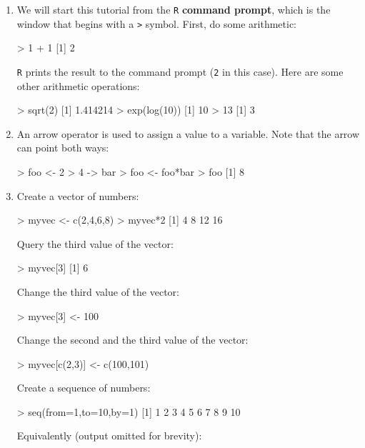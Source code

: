 \begin{enumerate}
\item We will start this tutorial from the \texttt{R} \textbf{command
  prompt}, which is the window that begins with a \verb|>|
  symbol. First, do some arithmetic:

\begin{console}
> 1 + 1
[1] 2
\end{console}

\texttt{R} prints the result to the command prompt (\verb|2| in this
case). Here are some other arithmetic operations:

\begin{console}
> sqrt(2)
[1] 1.414214
> exp(log(10))
[1] 10
> 13%
[1] 3
\end{console}

\item An arrow operator is used to assign a value to a variable. Note
  that the arrow can point both ways:

\begin{console}
> foo <- 2
> 4 -> bar
> foo <- foo*bar
> foo
[1] 8
\end{console}

\item Create a vector of numbers:

\begin{console}
> myvec <- c(2,4,6,8)
> myvec*2
[1]  4  8 12 16
\end{console}

Query the third value of the vector:

\begin{console}
> myvec[3]
[1] 6
\end{console}

Change the third value of the vector:

\begin{console}
> myvec[3] <- 100
\end{console}

Change the second and the third value of the vector:

\begin{console}
> myvec[c(2,3)] <- c(100,101)
\end{console}

Create a sequence of numbers:

\begin{console}
> seq(from=1,to=10,by=1)
 [1]  1  2  3  4  5  6  7  8  9 10
\end{console}

Equivalently (output omitted for brevity):


\end{enumerate}
